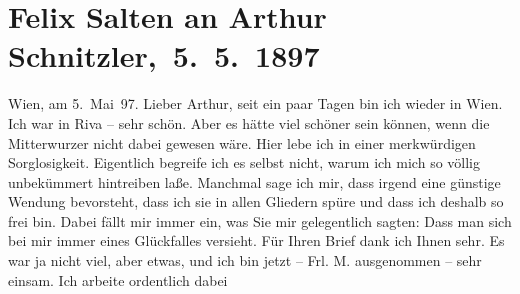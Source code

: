 

         
         \renewcommand{\erwaehntePersonen}{Personen: Richard Beer-Hofmann, Otto Brahm, Julius von Gans-Ludassy, Georg Hirschfeld, Hugo von Hofmannsthal, Wilhelmine Mitterwurzer, Felix Salten, Ottilie Salten, Gustav Schwarzkopf}
         \renewcommand{\erwaehnteOrte}{Orte: London, Paris, Riva del Garda, Wien}
         \renewcommand{\erwaehnteWerke}{Werke: Agnes Jordan. Schauspiel in fünf Akten}
               \section[ Felix Salten an Arthur Schnitzler, 5. 5. 1897]{ Felix Salten an Arthur Schnitzler, 5. 5. 1897}\nopagebreak{}\rehead{ }\begin{ledgroupsized}[t]{13cm}\normalsize\beginnumbering \toendnotes[C]{\smallbreak\pagebreak[2]} 
\toendnotes[C]{\smallbreak}\pstart
           \raggedleft{}{\pb}Wien, am 5. Mai 97.\pend
           \pstart
           Lieber Arthur, seit ein paar Tagen bin ich wieder in Wien. Ich war in Riva – sehr schön. Aber es hätte viel schöner sein können, wenn die Mitterwurzer nicht dabei gewesen wäre. Hier lebe ich in einer
               merkwürdigen Sorglosigkeit. Eigentlich begreife ich es selbst nicht, warum ich mich
               so völlig unbekümmert hintreiben laße. Manchmal sage ich mir, dass irgend eine
               günstige Wendung bevorsteht, dass ich sie in allen Gliedern spüre und dass ich
               deshalb so frei bin. Dabei fällt mir immer ein, was Sie mir gelegentlich sagten: Dass
               man sich bei mir immer eines Glückfalles versieht. Für Ihren Brief dank ich Ihnen
               sehr. Es war ja nicht viel, aber etwas, und ich bin jetzt – Frl. M. ausgenommen – sehr einsam. Ich arbeite ordentlich dabei

\end{ledgroupsized}
